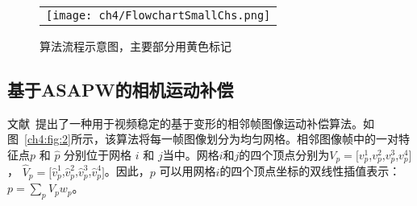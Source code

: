 \begin{figure}[!htbp]
\begin{center}
\begin{tabular}{c}
  \texttt{[image: ch4/FlowchartSmallChs.png]}
  \end{tabular}
\end{center}
\caption{算法流程示意图，主要部分用黄色标记}
\label{ch4:fig:1}       %
\end{figure}


\subsection{基于ASAPW的相机运动补偿}
\label{ch4:sec:sub:asap}
文献~提出了一种用于视频稳定的基于变形的相邻帧图像运动补偿算法。如图~\ref{ch4:fig:2}所示，该算法将每一帧图像划分为均匀网格。相邻图像帧中的一对特征点\(p\) 和 $\hat{p}$ 分别位于网格 \(i\) 和 \(j\)当中。网格$i$和$j$的四个顶点分别为${V}_{p}=[{v}^{1}_{p}$,${v}^{2}_{p}$,${v}^{3}_{p}$,${v}^{4}_{p}]$， ${\hat{V}_{p}}=[\hat{v}^{1}_{p}$,$\hat{v}^{2}_{p}$,$\hat{v}^{3}_{p}$,$\hat{v}^{4}_{p}]$。因此，\(p\) 可以用网格\(i\)的四个顶点坐标的双线性插值表示：$p=\sum_{p}{{V}_{p}{w}_{p}}$。

